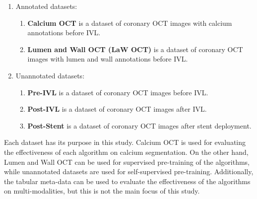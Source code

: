 \documentclass[a4paper,11pt,oneside]{report}
\begin{document}
\begin{enumerate}
    \item Annotated datasets:
    \begin{enumerate}
        \item \label{enum:calcium-dataset} \textbf{Calcium OCT} is a dataset of coronary OCT images with calcium annotations before IVL.
        \item \label{enum:lumen-and-wall-dataset} \textbf{Lumen and Wall OCT (LaW OCT)} is a dataset of coronary OCT images with lumen and wall annotations before IVL.
    \end{enumerate}
    \item \label{enum:unannotated-dataset} Unannotated datasets:
    \begin{enumerate}
        \item \textbf{Pre-IVL} is a dataset of coronary OCT images before IVL.
        \item \textbf{Post-IVL} is a dataset of coronary OCT images after IVL.
        \item \textbf{Post-Stent} is a dataset of coronary OCT images after stent deployment.
    \end{enumerate}
\end{enumerate}

Each dataset has its purpose in this study. Calcium OCT is used for evaluating the effectiveness of each algorithm on calcium segmentation. On the other hand, Lumen and Wall OCT can be used for supervised pre-training of the algorithms, while unannotated datasets are used for self-supervised pre-training. Additionally, the tabular meta-data can be used to evaluate the effectiveness of the algorithms on multi-modalities, but this is not the main focus of this study.
\end{document}
